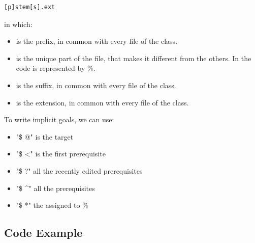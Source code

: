\begin{lstlisting}
[p]stem[s].ext
\end{lstlisting}
in which:
\begin{itemize}
	\item {} is the prefix, in common with every file of the class.
	\item {} is the unique part of the file, that makes it different from the others. In the code is represented by \%.
	\item {} is the suffix, in common with every file of the class.
	\item {} is the extension, in common with every file of the class.
\end{itemize}
To write implicit goals, we can use:
\begin{itemize}
	\item "\$ @" is the target
	\item "\$ \textless"  is the first prerequisite
	\item "\$ ?" all the recently edited prerequisites
	\item "\$ \textasciicircum" all the prerequisites
	\item "\$ *" the  assigned to \%
	
\end{itemize}
\pagebreak
\subsection{Code Example}

